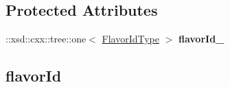 \subsection*{Protected Attributes}
\begin{DoxyCompactItemize}
\item 
\hypertarget{classopenstack_1_1xml_1_1Resize_aa3287163c58916a1cf3066cb9a0aafef}{
::xsd::cxx::tree::one$<$ \hyperlink{classopenstack_1_1xml_1_1Resize_aa31a13a5db9fb12fb0be8b0dc79dc3f7}{FlavorIdType} $>$ {\bfseries flavorId\_\-}}
\label{classopenstack_1_1xml_1_1Resize_aa3287163c58916a1cf3066cb9a0aafef}

\end{DoxyCompactItemize}
\subsection*{flavorId}
\label{_amgrpf15481678e23008099784831fbccce30}
